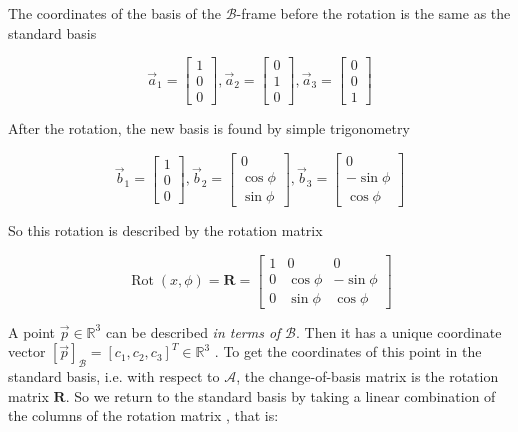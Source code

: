 \documentclass[a4paper]{report}
\DeclareMathOperator{\Rot}{Rot}
\newcommand{\matr}[1]{\mathbf{#1}}
\begin{document}
The coordinates of the basis of the $\mathcal{B}$-frame before the rotation is the same as the standard basis

\begin{equation}
\vec{a}_1 = 
\begin{bmatrix}
1 \\
0 \\
0
\end{bmatrix} 
, \vec{a}_2 =  
\begin{bmatrix}
0 \\
1 \\
0
\end{bmatrix}
, \vec{a}_3 = 
\begin{bmatrix}
0 \\
0 \\
1
\end{bmatrix}
\end{equation}

After the rotation, the new basis is found by simple trigonometry 

\begin{equation}
\vec{b}_1 = 
\begin{bmatrix}
1 \\
0 \\
0
\end{bmatrix} 
, \vec{b}_2 =  
\begin{bmatrix}
0 \\
\cos \phi \\
\sin \phi
\end{bmatrix}
, \vec{b}_3 = 
\begin{bmatrix}
0 \\
-\sin \phi \\
\cos \phi
\end{bmatrix}
\end{equation}

So this rotation is described by the rotation matrix

\begin{equation} \label{eq:rotx}
\Rot(x, \phi) = \matr{R}=
\begin{bmatrix}
1 & 0 & 0 \\
0 & \cos \phi  & -\sin \phi\\
0 & \sin \phi & \cos \phi
\end{bmatrix} 
\end{equation}

A point $\vec{p} \in \mathbb{R}^3$ can be described \textsl{in terms of} $\mathcal{B}$. Then it has a unique coordinate vector $[\vec{p}]_\mathcal{B}=[c_1, c_2, c_3]^T \in \mathbb{R}^3$ \cite[p. 218]{lay}.
To get the coordinates of this point in the standard basis, i.e. with respect to $\mathcal{A}$, the change-of-basis matrix is the rotation matrix $\matr{R}$. So we return to the standard basis by taking a linear combination of the columns of the rotation matrix \cite[p. 243]{lay}, that is:
\end{document}
